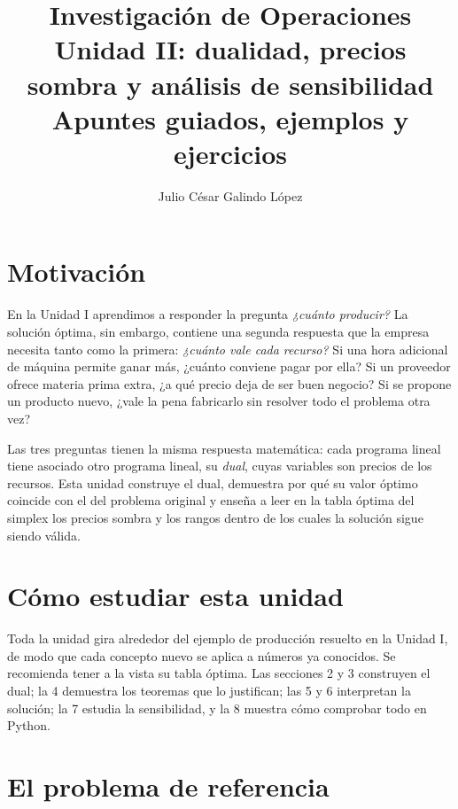 \documentclass[a4paper,11pt]{article}
\title{\textcolor{azul}{\Huge Investigación de Operaciones}\\[6pt]
\Large Unidad II: dualidad, precios sombra y análisis de sensibilidad\\[4pt]
\large Apuntes guiados, ejemplos y ejercicios}
\author{Julio César Galindo López}
\date{}
\theoremstyle{plain}
\theoremstyle{definition}
\begin{document}
\maketitle

\section*{Motivación}
En la Unidad I aprendimos a responder la pregunta \emph{¿cuánto producir?} La solución óptima, sin
embargo, contiene una segunda respuesta que la empresa necesita tanto como la primera: \emph{¿cuánto vale
cada recurso?} Si una hora adicional de máquina permite ganar más, ¿cuánto conviene pagar por ella? Si un
proveedor ofrece materia prima extra, ¿a qué precio deja de ser buen negocio? Si se propone un producto
nuevo, ¿vale la pena fabricarlo sin resolver todo el problema otra vez?

Las tres preguntas tienen la misma respuesta matemática: cada programa lineal tiene asociado otro programa
lineal, su \emph{dual}, cuyas variables son precios de los recursos. Esta unidad construye el dual, demuestra
por qué su valor óptimo coincide con el del problema original y enseña a leer en la tabla óptima del
simplex los precios sombra y los rangos dentro de los cuales la solución sigue siendo válida.

\section*{Cómo estudiar esta unidad}
Toda la unidad gira alrededor del ejemplo de producción resuelto en la Unidad I, de modo que cada concepto
nuevo se aplica a números ya conocidos. Se recomienda tener a la vista su tabla óptima. Las secciones 2 y 3
construyen el dual; la 4 demuestra los teoremas que lo justifican; las 5 y 6 interpretan la solución; la 7
estudia la sensibilidad, y la 8 muestra cómo comprobar todo en Python.

\tableofcontents
\newpage

\section{El problema de referencia}
\end{document}
